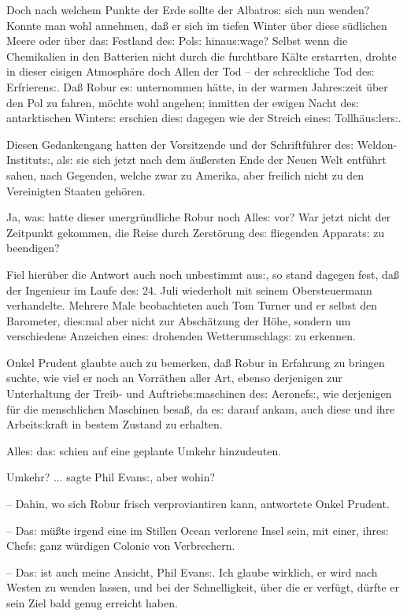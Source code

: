 \documentclass[oneside,12pt]{book}
\newcommand{\s}{s:}
\begin{document}
Doch nach welchem Punkte der Erde sollte der
{\glqq}Albatro{\s}{\grqq} sich nun wenden? Konnte man wohl annehmen,
da{\ss} er sich im tiefen Winter \"uber diese s\"udlichen Meere oder
\"uber da{\s} Festland de{\s} Pol{\s} hinau{\s}wage? Selbst wenn die
Chemikalien in den Batterien nicht durch die furchtbare K\"alte
erstarrten, drohte in dieser eisigen Atmosph\"are doch Allen der Tod
-- der schreckliche Tod de{\s} Erfrieren{\s}. Da{\ss} Robur e{\s}
unternommen h\"atte, in der warmen Jahre{\s}zeit \"uber den Pol zu
fahren, m\"ochte wohl angehen; inmitten der ewigen Nacht de{\s}
antarktischen Winter{\s} erschien die{\s} dagegen wie der Streich
eine{\s} Tollh\"au{\s}ler{\s}.

Diesen Gedankengang hatten der Vorsitzende und der Schriftf\"uhrer
de{\s} Weldon-Institut{\s}, al{\s} sie sich jetzt nach dem
\"au{\ss}ersten Ende der Neuen Welt entf\"uhrt sahen, nach Gegenden,
welche zwar zu Amerika, aber freilich nicht zu den Vereinigten
Staaten geh\"oren.

Ja, wa{\s} hatte dieser unergr\"undliche Robur noch Alle{\s} vor? War
jetzt nicht der Zeitpunkt gekommen, die Reise durch Zerst\"orung
de{\s} fliegenden Apparat{\s} zu beendigen?

Fiel hier\"uber die Antwort auch noch unbestimmt au{\s}, so stand
dagegen fest, da{\ss} der Ingenieur im Laufe de{\s} 24. Juli
wiederholt mit seinem Obersteuermann verhandelte. Mehrere Male
beobachteten auch Tom Turner und er selbst den Barometer, die{\s}mal
aber nicht zur Absch\"atzung der H\"ohe, sondern um verschiedene
Anzeichen eine{\s} drohenden Wetterumschlag{\s} zu erkennen.

Onkel Prudent glaubte auch zu bemerken, da{\ss} Robur in Erfahrung zu
bringen suchte, wie viel er noch an Vorr\"athen aller Art, ebenso
derjenigen zur Unterhaltung der Treib- und Auftrieb{\s}maschinen
de{\s} Aeronef{\s}, wie derjenigen f\"ur die menschlichen Maschinen
besa{\ss}, da e{\s} darauf ankam, auch diese und ihre Arbeit{\s}kraft
in bestem Zustand zu erhalten.

Alle{\s} da{\s} schien auf eine geplante Umkehr hinzudeuten.

{\glqq}Umkehr? ... sagte Phil Evan{\s}, aber wohin?

-- Dahin, wo sich Robur frisch verproviantiren kann, antwortete Onkel
Prudent.

-- Da{\s} m\"u{\ss}te irgend eine im Stillen Ocean verlorene Insel
sein, mit einer, ihre{\s} Chef{\s} ganz w\"urdigen Colonie von
Verbrechern.

-- Da{\s} ist auch meine Ansicht, Phil Evan{\s}. Ich glaube wirklich,
er wird nach Westen zu wenden lassen, und bei der Schnelligkeit,
\"uber die er verf\"ugt, d\"urfte er sein Ziel bald genug erreicht
haben.
\end{document}
